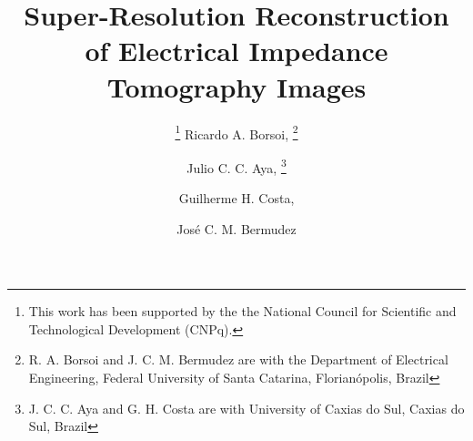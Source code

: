 \documentclass[10pt]{IEEEtran}
\begin{document}


\title{Super-Resolution Reconstruction of Electrical Impedance Tomography Images}








\author{\thanks{This work has been supported by the the National Council for Scientific and Technological Development (CNPq).}
%
Ricardo A. Borsoi,
%
\thanks{R. A. Borsoi and J. C. M. Bermudez are with the Department of Electrical Engineering, Federal University of Santa Catarina, Florian\'opolis, Brazil}
\and Julio C. C. Aya,
%
\thanks{J. C. C. Aya and G. H. Costa are with University of Caxias do Sul, Caxias do Sul, Brazil}
\and Guilherme H. Costa,
\and Jos\'e C. M. Bermudez}

















\end{document}
